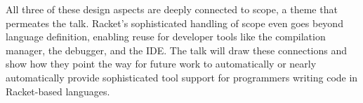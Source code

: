 \documentclass[runningheads]{llncs}
\begin{document}
All three of these design aspects are deeply connected to scope, a
theme that permeates the talk. Racket's sophisticated handling of
scope even goes beyond language definition, enabling reuse for
developer tools like the compilation manager, the debugger, and the
IDE. The talk will draw these connections and show how they point the
way for future work to automatically or nearly automatically provide
sophisticated tool support for programmers writing code in
Racket-based languages.
\end{document}
